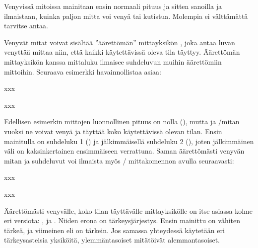 \begin{koodilohkosis}
\setlength{\parskip}{2ex plus 0.2ex minus 0.1ex}
\setlength{\parindent}{0em}
\end{koodilohkosis}

\noindent
Venyvissä mitoissa mainitaan ensin normaali pituus ja sitten sanoilla
 ja  ilmaistaan, kuinka paljon mitta voi venyä
tai kutistua. Molempia ei välttämättä tarvitse antaa.

Venyvät mitat voivat sisältää ''äärettömän'' mittayksikön ,
joka antaa luvan venyttää mittaa niin, että kaikki käytettävissä oleva
tila täyttyy. Äärettömän mittayksikön kanssa mittaluku ilmaisee
suhdeluvun muihin äärettömiin mittoihin. Seuraava esimerkki
havainnollistaa asiaa:

\begin{koodilohkosis}
x\hspace{0mm plus 1fill}x\hspace{0mm plus 2fill}x
\end{koodilohkosis}

\begin{tulossis}
  x\hspace{0mm plus 1fill}x\hspace{0mm plus 2fill}x
\end{tulossis}

\noindent
Edellisen esimerkin mittojen luonnollinen pituus on nolla (\koodi{0mm}),
mutta  ja  \=/mitan vuoksi ne voivat venyä ja
täyttää koko käytettävissä olevan tilan. Ensin mainitulla on suhdeluku 1
() ja jälkimmäisellä suhdeluku 2 (), joten
jälkimmäinen väli on kaksinkertainen ensimmäiseen verrattuna. Saman
äärettömästi venyvän mitan ja suhdeluvut voi ilmaista myös
\-/ mittakomennon avulla seuraavasti:

\begin{koodilohkosis}
xxx
\end{koodilohkosis}

\begin{tulossis}
  xxx
\end{tulossis}

\noindent
Äärettömästi venyvälle, koko tilan täyttävälle mittayksikölle on itse
asiassa kolme eri versiota: ,  ja .
Niiden erona on tärkeysjärjestys. Ensin mainittu  on vähiten
tärkeä, ja viimeinen eli  on tärkein. Jos samassa
yhteydessä käytetään eri tärkeysasteisia yksiköitä, ylemmäntasoiset
mitätöivät alemmantasoiset.

